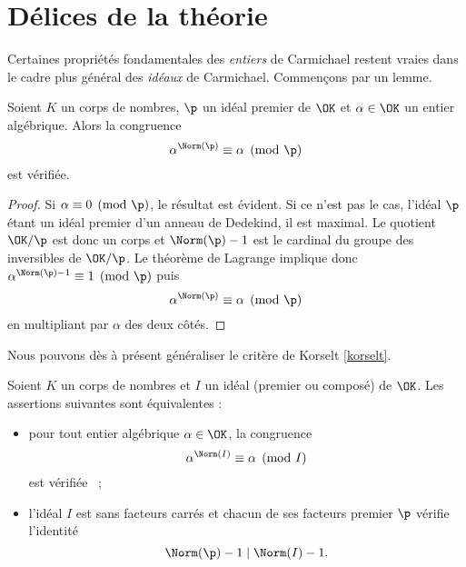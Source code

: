 \section{Délices de la théorie}

Certaines propriétés fondamentales des \emph{entiers} de Carmichael restent vraies dans le cadre plus général des \emph{idéaux} de Carmichael. Commençons par un lemme.

\begin{lemme}\label{identite-1}
	Soient $K$ un corps de nombres, $\p$ un idéal premier de $\OK$ et $\alpha \in \OK$ un entier algébrique. Alors la congruence \[\alpha^{\Norm(\p)} \equiv \alpha \pmod{\p}\] est vérifiée.
\end{lemme}

\begin{proof}
	Si $\alpha\equiv 0\pmod{\p}$, le résultat est évident. Si ce n'est pas le cas, l'idéal $\p$ étant un idéal premier d'un anneau de Dedekind, il est maximal. Le quotient $\OK/\p$ est donc un corps et $\Norm(\p) -1$ est le cardinal du groupe des inversibles de $\OK/\p$. Le théorème de Lagrange implique donc $\alpha^{\Norm(\p)-1}\equiv 1 \pmod{\p}$ puis \[\alpha^{\Norm(\p)} \equiv \alpha \pmod{\p}\] en multipliant par $\alpha$ des deux côtés.
\end{proof}

Nous pouvons dès à présent généraliser le critère de Korselt \ref{korselt}.

\begin{theoreme}\label{korselt-generalise}
	Soient $K$ un corps de nombres et $I$ un idéal (premier ou composé) de $\OK$. Les assertions suivantes sont équivalentes :
	\begin{itemize}
		\item pour tout entier algébrique $\alpha \in \OK$, la congruence \[\alpha^{\Norm(I)} \equiv \alpha \pmod{I}\] est vérifiée ~;
		\item l'idéal $I$ est sans facteurs carrés et chacun de ses facteurs premier $\p$ vérifie l'identité \[\Norm(\p) - 1 \mid \Norm(I) - 1.\]
	\end{itemize}
\end{theoreme}

